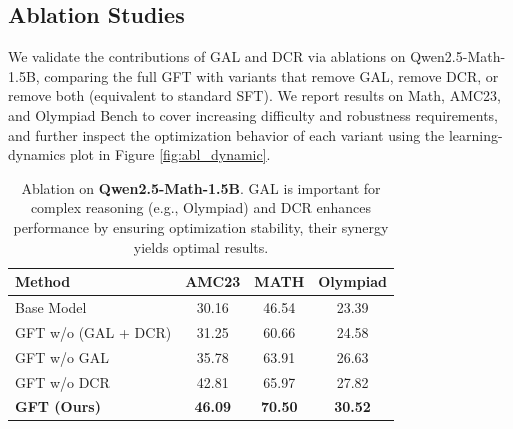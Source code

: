 
\subsection{Ablation Studies}
\label{sec:ablation}

We validate the contributions of GAL and DCR via ablations on Qwen2.5-Math-1.5B, comparing the full GFT with variants that remove GAL, remove DCR, or remove both (equivalent to standard SFT). We report results on Math, AMC23, and Olympiad Bench to cover increasing difficulty and robustness requirements, and further inspect the optimization behavior of each variant using the learning-dynamics plot in Figure \ref{fig:abl_dynamic}.

\begin{table}[!t]
    \centering
    \footnotesize
    \caption{Ablation on \textbf{Qwen2.5-Math-1.5B}. GAL is important for complex reasoning (e.g., Olympiad) and DCR enhances performance by ensuring optimization stability, their synergy yields optimal results.}
    \label{tab:ablation}
    
    \setlength{\tabcolsep}{4pt}
    \renewcommand{\arraystretch}{1.2}
    
    \begin{tabular}{lccc}
        \toprule
        \textbf{Method} & \textbf{AMC23} & \textbf{MATH} & \textbf{Olympiad} \\
        \midrule
        Base Model & 30.16 & 46.54 & 23.39 \\
        \midrule
        GFT w/o (GAL + DCR) & 31.25 & 60.66 & 24.58 \\
        GFT w/o GAL & 35.78 & 63.91 & 26.63 \\
        GFT w/o DCR & 42.81 & 65.97 & 27.82 \\
        \textbf{GFT (Ours)} & \textbf{46.09} & \textbf{70.50} & \textbf{30.52} \\
        \bottomrule
    \end{tabular}
\end{table}

